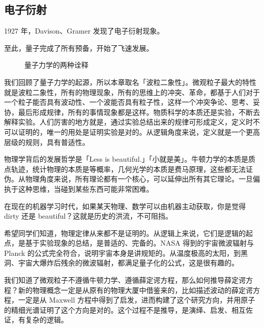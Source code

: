 \subsection{电子衍射}

1927 年，Davison、Gramer 发现了电子衍射现象。

至此，量子完成了所有预备，开始了飞速发展。

\begin{figure}\centering
    \caption{量子力学的两种诠释}
\end{figure}

我们回顾了量子力学的起源，所以本章取名「波粒二象性」。微观粒子最大的特性就是波粒二象性，所有的物理现象，所有的思维上的冲突、革命，都基于人们对于一个粒子能否具有波动性、一个波能否具有粒子性，这样一个冲突争论、思考、妥协，最后形成规律，所有的事情现象都是这样。物质科学的本质还是实验，不断去解释实验。人们厉害的地方就是，通过实验总结出来的规律可形成定义，定义时不可以证明的，唯一的用处是证明实验是对的。从逻辑角度来说，定义就是一个更高层级的规则，具有普适性。

物理学背后的发展哲学是「Less is beautiful.」「小就是美」。牛顿力学的本质是质点轨迹，统计物理的本质是等概率，几何光学的本质是费马原理，这些都无法证伪。从物理角度来说，所有理论都有一个核心，可以延伸出所有其它理论。一旦偏执于这种思维，当碰到某些东西可能非常困难。

在现在的机器学习时代，如果某天物理、数学可以由机器主动获取，你是觉得 dirty 还是 beautiful？这就是历史的洪流，不可阻挡。


希望同学们知道，物理定律从来都不是证明的。从逻辑上来说，它们是逻辑的起点，是基于实验现象的总结，是普适的、完备的。NASA 得到的宇宙微波辐射与 Planck 的公式完全符合，说明宇宙本身是讲规矩的。从温度极高的太阳，到黑洞、宇宙大爆炸后残余的微波辐射，都满足量子化的公式，这是很有趣的。

我们知道了微观粒子不遵循牛顿力学、遵循薛定谔方程，那么如何推导薛定谔方程？新的物理概念一定是从原有的物理大厦中借鉴来的，比如描述波动的薛定谔方程，一定是从 Maxwell 方程中得到了启发，进而构建了这个研究方向，并用原子的精细光谱证明了这个方向是对的。这个过程不是推导，是演绎、启发、相互佐证，有复杂的逻辑。


